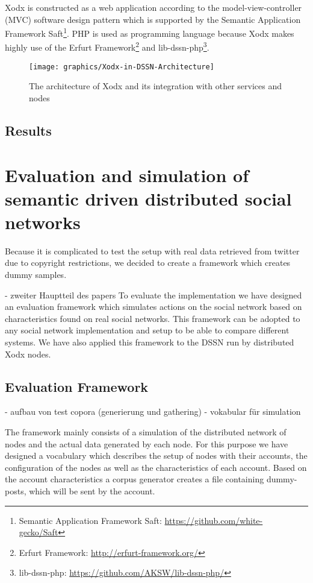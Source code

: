 \documentclass{llncs}
\begin{document}
Xodx is constructed as a web application according to the model-view-controller (MVC) software design pattern which is supported by the Semantic Application Framework Saft\footnote{Semantic Application Framework Saft: \url{https://github.com/white-gecko/Saft}}.
PHP is used as programming language because Xodx makes highly use of the Erfurt Framework\footnote{Erfurt Framework: \url{http://erfurt-framework.org/}} and lib-dssn-php\footnote{lib-dssn-php: \url{https://github.com/AKSW/lib-dssn-php/}}.

\begin{figure}
    \begin{center}
        \texttt{[image: graphics/Xodx-in-DSSN-Architecture]}
    \end{center}
\caption{The architecture of Xodx and its integration with other services and nodes}
\label{Xodx_arch}
\end{figure}


\subsection{Results}


\section{Evaluation and simulation of semantic driven distributed social networks}
Because it is complicated to test the setup with real data retrieved from twitter due to copyright restrictions, we decided to create a framework which creates dummy samples.

- zweiter Hauptteil des papers
To evaluate the implementation we have designed an evaluation framework which simulates actions on the social network based on characteristics found on real social networks.
This framework can be adopted to any social network implementation and setup to be able to compare different systems.
We have also applied this framework to the DSSN run by distributed Xodx nodes.


\subsection{Evaluation Framework}
- aufbau von test copora (generierung und gathering)
- vokabular für simulation

The framework mainly consists of a simulation of the distributed network of nodes and the actual data generated by each node.
For this purpose we have designed a vocabulary which describes the setup of nodes with their accounts, the configuration of the nodes as well as the characteristics of each account.
Based on the account characteristics a corpus generator creates a file containing dummy-posts, which will be sent by the account.
\end{document}

